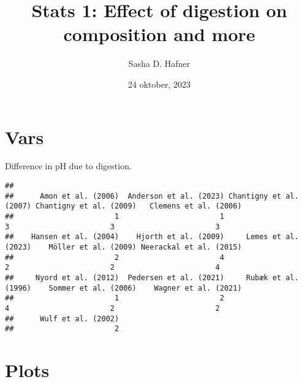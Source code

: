 \documentclass[
]{article}
\title{Stats 1: Effect of digestion on composition and more}
\author{Sasha D. Hafner}
\date{24 oktober, 2023}
\newenvironment{Shaded}{\begin{snugshade}}{\end{snugshade}}
\newcommand{\FunctionTok}[1]{\textcolor[rgb]{0.13,0.29,0.53}{\textbf{#1}}}
\newcommand{\NormalTok}[1]{#1}
\newcommand{\OtherTok}[1]{\textcolor[rgb]{0.56,0.35,0.01}{#1}}
\newcommand{\SpecialCharTok}[1]{\textcolor[rgb]{0.81,0.36,0.00}{\textbf{#1}}}
\begin{document}
\maketitle

\hypertarget{vars}{%
\section{Vars}\label{vars}}

Difference in pH due to digestion.

\begin{Shaded}
\end{Shaded}

\begin{Shaded}
\end{Shaded}

\begin{verbatim}
## 
##      Amon et al. (2006)  Anderson et al. (2023) Chantigny et al. (2007) Chantigny et al. (2009)   Clemens et al. (2006) 
##                       1                       1                       3                       3                       3 
##    Hansen et al. (2004)    Hjorth et al. (2009)     Lemes et al. (2023)    Möller et al. (2009) Neerackal et al. (2015) 
##                       2                       4                       2                       2                       4 
##     Nyord et al. (2012)  Pedersen et al. (2021)     Rubæk et al. (1996)    Sommer et al. (2006)    Wagner et al. (2021) 
##                       1                       2                       4                       2                       2 
##      Wulf et al. (2002) 
##                       2
\end{verbatim}

\hypertarget{plots}{%
\section{Plots}\label{plots}}
\end{document}
